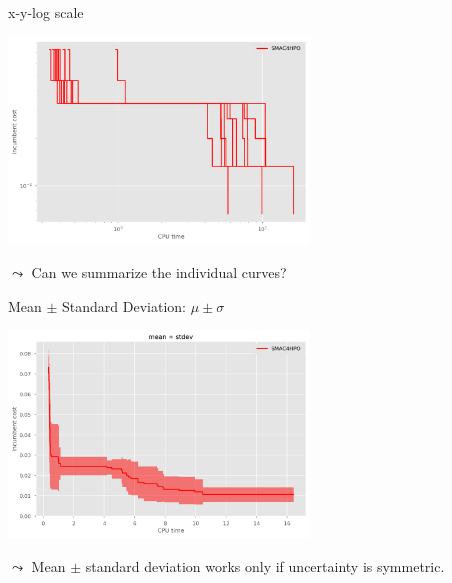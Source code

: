 
\begin{frame}[c]{x-y-log scale}
	
	\centering
	\includegraphics[width=0.6\textwidth]{plots/cpu_time/6_3_smac4hpo_step_log_x_y.png}
	
	\pause
	$\leadsto$ Can we summarize the individual curves?
	
\end{frame}


\begin{frame}[c]{Mean $\pm$ Standard Deviation: $\mu \pm \sigma$}
	
	\centering
	\includegraphics[width=0.6\textwidth]{plots/cpu_time/8_1_smac4hpo_mean_stdev.png}
	
	\pause
	$\leadsto$ Mean $\pm$ standard deviation works only if uncertainty is symmetric.
	
\end{frame}


